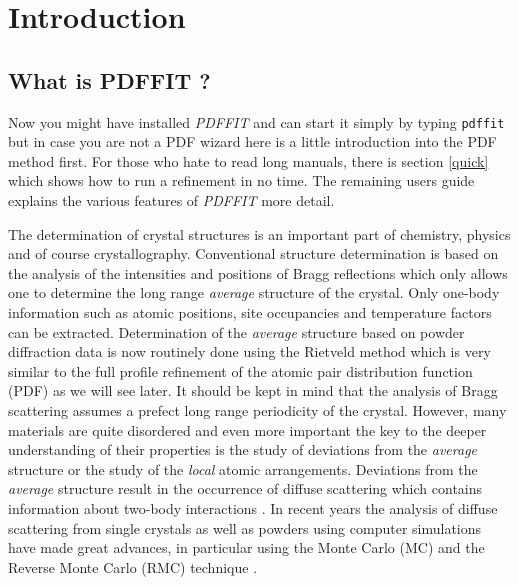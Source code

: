 
\chapter{Introduction \label{intro}}
\section{What is PDFFIT ?}

Now you might have installed {\it PDFFIT} and can start it simply
by typing {\tt pdffit} but in case you are not a PDF wizard here is
a little introduction into the PDF method first. For those who hate
to read long manuals, there is section \ref{quick} which shows how
to run a refinement in no time. The remaining users guide explains
the various features of {\it PDFFIT} more detail. \par

The determination of crystal structures is an important part of
chemistry, physics and of course crystallography. Conventional
structure determination is based on the analysis of the
intensities and positions of Bragg reflections which only allows
one to determine the long range {\it average} structure of the
crystal. Only one-body information such as atomic positions, site
occupancies and temperature factors can be extracted.
Determination of the {\it average} structure based on powder
diffraction data is now routinely done using the Rietveld
\citep{rietv;jac69} method which is very similar to the full
profile refinement of the atomic pair distribution function (PDF)
as we will see later. It should be kept in mind that the analysis
of Bragg scattering assumes a prefect long range periodicity of
the crystal. However, many materials are quite disordered and even
more important the key to the deeper understanding of their
properties is the study of deviations from the {\it average}
structure or the study of the {\it local} atomic arrangements.
Deviations from the {\it average} structure result in the
occurrence of diffuse scattering which contains information about
two-body interactions \citep{webu95,fr95}. In recent years the
analysis of diffuse scattering from single crystals as well as
powders using computer simulations have made great advances, in
particular using the Monte Carlo (MC) and the Reverse Monte Carlo
(RMC) technique \citep{webu95,nikemc95,wepr98,prwe98b,prwe97b}.
\par

